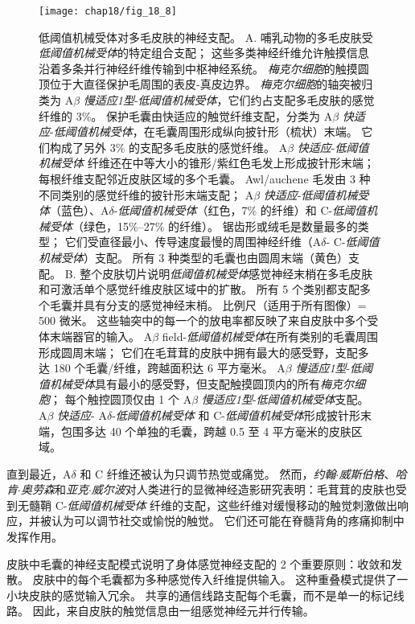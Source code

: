 \begin{figure}[htbp]
	\centering
	\texttt{[image: chap18/fig\_18\_8]}
	\caption{低阈值机械受体对多毛皮肤的神经支配。
		A. 哺乳动物的多毛皮肤受\textit{低阈值机械受体}的特定组合支配；
		这些多类神经纤维允许触摸信息沿着多条并行神经纤维传输到中枢神经系统。
		\textit{梅克尔细胞}的触摸圆顶位于大直径保护毛周围的表皮-真皮边界。
		\textit{梅克尔细胞}的轴突被归类为 A$\beta$ \textit{慢适应1型}-\textit{低阈值机械受体}，它们约占支配多毛皮肤的感觉纤维的 3\%。
		保护毛囊由快适应的触觉纤维支配，分类为 A$\beta$ \textit{快适应}-\textit{低阈值机械受体}，在毛囊周围形成纵向披针形（梳状）末端。
		它们构成了另外 3\% 的支配多毛皮肤的感觉纤维。
		A$\beta$ \textit{快适应}-\textit{低阈值机械受体} 纤维还在中等大小的锥形/紫红色毛发上形成披针形末端； 每根纤维支配邻近皮肤区域的多个毛囊。
		Awl/auchene 毛发由 3 种不同类别的感觉纤维的披针形末端支配；
		A$\beta$ \textit{快适应}-\textit{低阈值机械受体}（蓝色）、A$\delta$-\textit{低阈值机械受体}（红色，7\% 的纤维）和 C-\textit{低阈值机械受体}（绿色，15\%–27\% 的纤维）。
		锯齿形或绒毛是数量最多的类型；
		它们受直径最小、传导速度最慢的周围神经纤维（A$\delta$- C-\textit{低阈值机械受体}）支配。 
		所有 3 种类型的毛囊也由圆周末端（黄色）支配\cite{zimmerman2014gentle}。
		B. 整个皮肤切片说明\textit{低阈值机械受体}感觉神经末梢在多毛皮肤和可激活单个感觉纤维皮肤区域中的扩散。
		所有 5 个类别都支配多个毛囊并具有分支的感觉神经末梢。
		比例尺（适用于所有图像）= 500 微米。 
		这些轴突中的每一个的放电率都反映了来自皮肤中多个受体末端器官的输入。
		A$\beta$ field-\textit{低阈值机械受体}在所有类别的毛囊周围形成圆周末端；
		它们在毛茸茸的皮肤中拥有最大的感受野，支配多达 180 个毛囊/纤维，跨越面积达 6 平方毫米。
		A$\beta$ \textit{慢适应1型}-\textit{低阈值机械受体}具有最小的感受野，但支配触摸圆顶内的所有\textit{梅克尔细胞}；
		每个触控圆顶仅由 1 个 A$\beta$ \textit{慢适应1型}-\textit{低阈值机械受体}支配。
		A$\beta$ \textit{快适应}- A$\delta$-\textit{低阈值机械受体} 和 C-\textit{低阈值机械受体}形成披针形末端，包围多达 40 个单独的毛囊，跨越 0.5 至 4 平方毫米的皮肤区域\cite{bai2015genetic}。}
	\label{fig:18_8}
\end{figure}


直到最近，A$\delta$ 和 C 纤维还被认为只调节热觉或痛觉。
然而，\textit{约翰$\cdot$威斯伯格}、\textit{哈肯$\cdot$奥劳森}和\textit{亚克$\cdot$威尔波}对人类进行的显微神经造影研究表明：毛茸茸的皮肤也受到无髓鞘 C-\textit{低阈值机械受体} 纤维的支配，这些纤维对缓慢移动的触觉刺激做出响应，并被认为可以调节社交或愉悦的触觉。
它们还可能在脊髓背角的疼痛抑制中发挥作用。


皮肤中毛囊的神经支配模式说明了身体感觉神经支配的 2 个重要原则：收敛和发散。
皮肤中的每个毛囊都为多种感觉传入纤维提供输入。
这种重叠模式提供了一小块皮肤的感觉输入冗余。
共享的通信线路支配每个毛囊，而不是单一的标记线路。 
因此，来自皮肤的触觉信息由一组感觉神经元并行传输。


